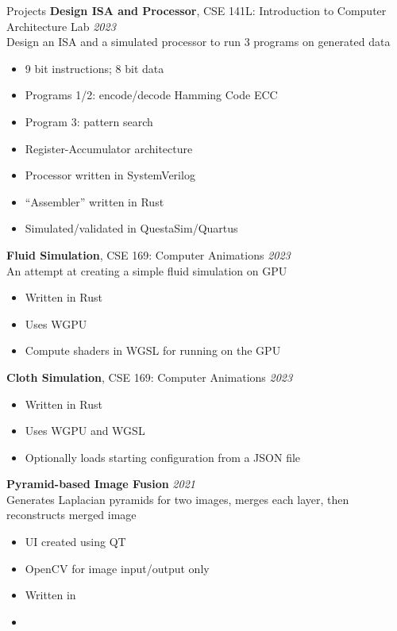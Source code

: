 \begin{rSection}{Projects}
		{\bf Design ISA and Processor}{, CSE 141L: Introduction to Computer Architecture Lab} \hfill {\em 2023} \\
		Design an ISA and a simulated processor to run 3 programs on generated data
		\begin{multicols}{2}
			\begin{itemize}
				\item 9 bit instructions; 8 bit data
				\item Programs 1/2: encode/decode Hamming Code ECC
				\item Program 3: pattern search
				\item Register-Accumulator architecture
				\item Processor written in SystemVerilog
				\item ``Assembler'' written in Rust
				\item Simulated/validated in QuestaSim/Quartus
			\end{itemize}
		\end{multicols}

		{\bf Fluid Simulation}{, CSE 169: Computer Animations} \hfill {\em 2023} \\
		An attempt at creating a simple fluid simulation on GPU
		\begin{multicols}{2}
			\begin{itemize}
				\item Written in Rust
				\item Uses WGPU
				\item Compute shaders in WGSL for running on the GPU
			\end{itemize}
		\end{multicols}

		{\bf Cloth Simulation}{, CSE 169: Computer Animations} \hfill {\em 2023}
		\begin{multicols}{2}
			\begin{itemize}
				\item Written in Rust
				\item Uses WGPU and WGSL
				\item Optionally loads starting configuration from a JSON file
			\end{itemize}
		\end{multicols}

		{\bf Pyramid-based Image Fusion}{} \hfill {\em 2021} \\
		Generates Laplacian pyramids for two images, merges each layer, then reconstructs merged image
		\begin{multicols}{2}
			\begin{itemize}
				\item UI created using QT
				\item OpenCV for image input/output only
				\item Written in \CC
				\item[\vspace{\fill}] %
			\end{itemize}
		\end{multicols}


\end{rSection}

